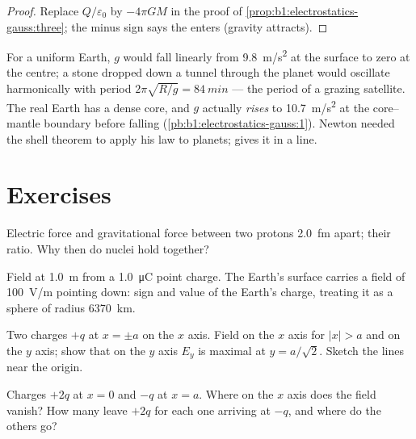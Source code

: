 \begin{proof}
Replace $Q/\varepsilon_0$ by $-4\pi GM$ in the proof of
\cref{prop:b1:electrostatics-gauss:three}; the minus sign says the 
enters (gravity attracts).
\end{proof}

\begin{example}\label{ex:b1:electrostatics-gauss:earth}
For a uniform Earth, $g$ would fall linearly from \qty{9.8}{m/s^2} at the
surface to zero at the centre; a stone dropped down a tunnel through
the planet would oscillate harmonically with period $2\pi\sqrt{R/g} =
\qty{84}{min}$ --- the period of a grazing satellite. The real Earth has
a dense core, and $g$ actually \emph{rises} to \qty{10.7}{m/s^2} at the
core--mantle boundary before falling (\cref{pb:b1:electrostatics-gauss:1}).
Newton needed the shell theorem to apply his law to planets;  gives it in a line.
\end{example}

\section{Exercises}

\begin{exercise}[$\star$]\label{exo:b1:electrostatics-gauss:1}
Electric force and gravitational force between two protons
\qty{2.0}{fm} apart; their ratio. Why then do nuclei hold together?
\end{exercise}

\begin{exercise}[$\star$]\label{exo:b1:electrostatics-gauss:2}
Field at \qty{1.0}{m} from a \qty{1.0}{\micro C} point charge. The Earth's
surface carries a field of \qty{100}{V/m} pointing down: sign and value of
the Earth's charge, treating it as a sphere of radius \qty{6370}{km}.
\end{exercise}

\begin{exercise}[$\star$]\label{exo:b1:electrostatics-gauss:3}
Two charges $+q$ at $x = \pm a$ on the $x$ axis. Field on the $x$ axis
for $|x| > a$ and on the $y$ axis; show that on the $y$ axis $E_y$ is
maximal at $y = a/\sqrt2$. Sketch the lines near the origin.
\end{exercise}

\begin{exercise}[$\star$]\label{exo:b1:electrostatics-gauss:4}
Charges $+2q$ at $x = 0$ and $-q$ at $x = a$. Where on the $x$ axis does
the field vanish? How many  leave $+2q$ for each one
arriving at $-q$, and where do the others go?
\end{exercise}

